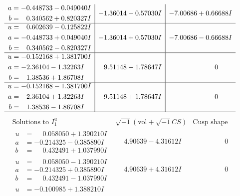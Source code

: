 \documentclass[1p]{elsarticle_modified}
\theoremstyle{definition}
\newcommand{\I}{\sqrt{-1}}
\begin{document}
$$\begin{array}{c|c|c}
\begin{aligned}
a &= -0.448733 - 0.049040 I \\
b &= \phantom{-}0.340562 + 0.820327 I\end{aligned}
 & -1.36014 - 0.57030 I & -7.00686 + 0.66688 I \\ \hline\begin{aligned}
u &= \phantom{-}0.602639 - 0.125822 I \\
a &= -0.448733 + 0.049040 I \\
b &= \phantom{-}0.340562 - 0.820327 I\end{aligned}
 & -1.36014 + 0.57030 I & -7.00686 - 0.66688 I \\ \hline\begin{aligned}
u &= -0.152168 + 1.381700 I \\
a &= -2.36104 - 1.32263 I \\
b &= \phantom{-}1.38536 + 1.86708 I\end{aligned}
 & \phantom{-}9.51148 - 1.78647 I & \phantom{-0.000000 } 0 \\ \hline\begin{aligned}
u &= -0.152168 - 1.381700 I \\
a &= -2.36104 + 1.32263 I \\
b &= \phantom{-}1.38536 - 1.86708 I\end{aligned}
 & \phantom{-}9.51148 + 1.78647 I & \phantom{-0.000000 } 0\\
 \hline 
 \end{array}$$\newpage$$\begin{array}{c|c|c}  
\text{Solutions to }I^u_{1}& \I (\text{vol} + \sqrt{-1}CS) & \text{Cusp shape}\\
 \hline 
\begin{aligned}
u &= \phantom{-}0.058050 + 1.390210 I \\
a &= -0.214325 - 0.385890 I \\
b &= \phantom{-}0.432491 + 1.037990 I\end{aligned}
 & \phantom{-}4.90639 - 4.31612 I & \phantom{-0.000000 } 0 \\ \hline\begin{aligned}
u &= \phantom{-}0.058050 - 1.390210 I \\
a &= -0.214325 + 0.385890 I \\
b &= \phantom{-}0.432491 - 1.037990 I\end{aligned}
 & \phantom{-}4.90639 + 4.31612 I & \phantom{-0.000000 } 0 \\ \hline\begin{aligned}
u &= -0.100985 + 1.388210 I \\

\end{aligned}
\end{array}$$
\end{document}
